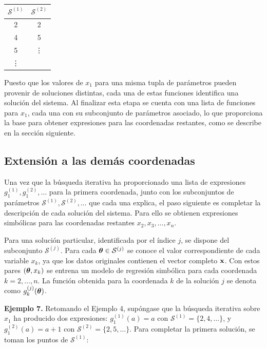 \begin{center} \begin{tabular}{c|c}
\(\mathcal{S}^{(1)}\) & \(\mathcal{S}^{(2)}\) \\
\hline
2 & 2 \\
4 & 5 \\
5 & \vdots \\
\vdots & \end{tabular} \end{center}

Puesto que los valores de \(x_1\) para una misma tupla de parámetros pueden provenir de soluciones distintas, cada una de estas funciones identifica una solución del sistema. Al finalizar esta etapa se cuenta con una lista de funciones para \(x_1\), cada una con su subconjunto de parámetros asociado, lo que proporciona la base para obtener expresiones para las coordenadas restantes, como se describe en la sección siguiente.

\subsection{Extensión a las demás coordenadas} \label{sec:extension_coordenadas}

Una vez que la búsqueda iterativa ha proporcionado una lista de expresiones \(g_1^{(1)}, g_1^{(2)}, \dots\) para la primera coordenada, junto con los subconjuntos de parámetros \(\mathcal{S}^{(1)}, \mathcal{S}^{(2)}, \dots\) que cada una explica, el paso siguiente es completar la descripción de cada solución del sistema. Para ello se obtienen expresiones simbólicas para las coordenadas restantes \(x_2, x_3, \dots, x_n\).

Para una solución particular, identificada por el índice \(j\), se dispone del subconjunto \(\mathcal{S}^{(j)}\). Para cada \(\boldsymbol{\theta} \in \mathcal{S}^{(j)}\) se conoce el valor correspondiente de cada variable \(x_k\), ya que los datos originales contienen el vector completo \(\mathbf{x}\). Con estos pares \((\boldsymbol{\theta}, x_k)\) se entrena un modelo de regresión simbólica para cada coordenada \(k = 2, \dots, n\). La función obtenida para la coordenada \(k\) de la solución \(j\) se denota como \(g_k^{(j)}(\boldsymbol{\theta})\).

\bigskip \noindent\textbf{Ejemplo 7.} Retomando el Ejemplo 4, supóngase que la búsqueda iterativa sobre \(x_1\) ha producido dos expresiones: \(g_1^{(1)}(a) = a\) con \(\mathcal{S}^{(1)} = \{2, 4, \dots\}\), y \(g_1^{(2)}(a) = a + 1\) con \(\mathcal{S}^{(2)} = \{2, 5, \dots\}\). Para completar la primera solución, se toman los puntos de \(\mathcal{S}^{(1)}\):

